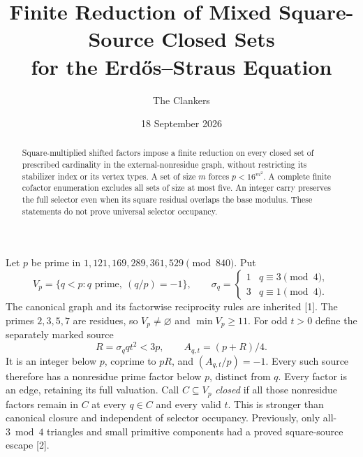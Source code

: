 \documentclass[11pt,reqno]{amsart}
\title{Finite Reduction of Mixed Square-Source Closed Sets\\for the Erd\H{o}s--Straus Equation}
\author{The Clankers}\date{18 September 2026}
\begin{document}
\begin{abstract}
Square-multiplied shifted factors impose a finite reduction on every closed set
of prescribed cardinality in the external-nonresidue graph, without restricting
its stabilizer index or its vertex types. A set of size $m$ forces $p<16^{m^2}$.
A complete finite cofactor enumeration excludes all sets of size at most five.
An integer carry preserves the full selector even when its square residual overlaps
the base modulus. These statements do not prove universal selector occupancy.
\end{abstract}\maketitle

Let $p$ be prime in $1,121,169,289,361,529\pmod{840}$. Put
\[
 V_p=\{q<p:q\text{ prime},\ (q/p)=-1\},\qquad
 \sigma_q=\begin{cases}1&q\equiv3\pmod4,\\3&q\equiv1\pmod4.\end{cases}
\]
The canonical graph and its factorwise reciprocity rules are inherited [1].
The primes $2,3,5,7$ are residues, so $V_p\ne\varnothing$ and $\min V_p\ge11$.
For odd $t>0$ define the separately marked source
\[
 R=\sigma_q qt^2<3p,\qquad A_{q,t}=(p+R)/4.
\]
It is an integer below $p$, coprime to $pR$, and $(A_{q,t}/p)=-1$.
Every such source therefore has a nonresidue prime factor below $p$, distinct
from $q$. Every factor is an edge, retaining its full valuation.
Call $C\subseteq V_p$ \emph{closed} if all those nonresidue factors remain in $C$
at every $q\in C$ and every valid $t$. This is stronger than canonical closure
and independent of selector occupancy. Previously, only all-$3\bmod4$ triangles
and small primitive components had a proved square-source escape [2].
\end{document}
